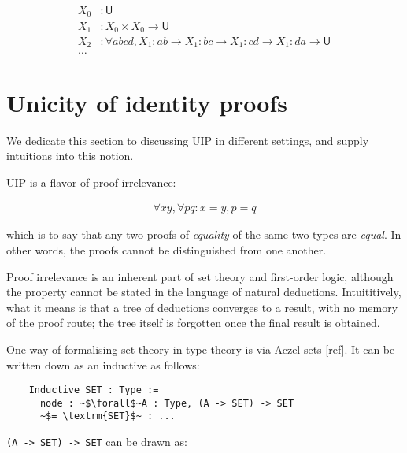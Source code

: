\documentclass[10pt]{art}
\newcommand{\U}[1]{\ensuremath{\mathsf{U}_{#1}}}
\begin{document}
\begin{align*}
  X_0 & : \U{}                                                                                                      \\
  X_1 & : X_0 \times X_0 \rightarrow \U{}                                                                           \\
  X_2 & : \forall a b c d, X_1 : ab \rightarrow X_1 : bc \rightarrow X_1 : cd \rightarrow X_1 : da \rightarrow \U{} \\
  \ldots
\end{align*}

\section{Unicity of identity proofs\label{sec:uip}}
We dedicate this section to discussing UIP in different settings, and supply intuitions into this notion.

UIP is a flavor of proof-irrelevance:

\begin{align*}
  \forall x y, \forall p q : x = y, p = q
\end{align*}

which is to say that any two proofs of \emph{equality} of the same two types are \emph{equal}. In other words, the proofs cannot be distinguished from one another.

Proof irrelevance is an inherent part of set theory and first-order logic, although the property cannot be stated in the language of natural deductions. Intuititively, what it means is that a tree of deductions converges to a result, with no memory of the proof route; the tree itself is forgotten once the final result is obtained.

One way of formalising set theory in type theory is via Aczel sets [ref]. It can be written down as an inductive as follows:

\begin{listing}[H]
  \begin{verbatim}
    Inductive SET : Type :=
      node : ~$\forall$~A : Type, (A -> SET) -> SET
      ~$=_\textrm{SET}$~ : ...
  \end{verbatim}
\end{listing}

\texttt{(A -> SET) -> SET} can be drawn as:
\end{document}
